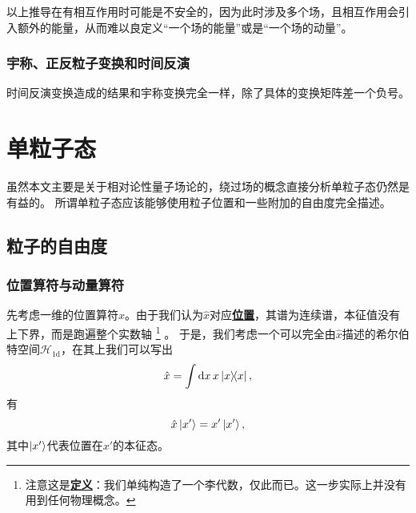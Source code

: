 \documentclass[hyperref, UTF8, a4paper]{ctexart}
\newcommand{\concept}[1]{\underline{\textbf{#1}}}
\begin{document}
以上推导在有相互作用时可能是不安全的，因为此时涉及多个场，且相互作用会引入额外的能量，从而难以良定义“一个场的能量”或是“一个场的动量”。

\subsubsection{宇称、正反粒子变换和时间反演}

时间反演变换造成的结果和宇称变换完全一样，除了具体的变换矩阵差一个负号。


\section{单粒子态}\label{sec:single-particle}


虽然本文主要是关于相对论性量子场论的，绕过场的概念直接分析单粒子态仍然是有益的。
所谓单粒子态应该能够使用粒子位置和一些附加的自由度完全描述。

\subsection{粒子的自由度}\label{sec:single-particle-quantity}

\subsubsection{位置算符与动量算符}\label{sec:position-and-momentum}

先考虑一维的位置算符$\hat{x}$。由于我们认为$\hat{x}$对应\concept{位置}，其谱为连续谱，本征值没有上下界，而是跑遍整个实数轴%
\footnote{注意这是\concept{定义}：我们单纯构造了一个李代数，仅此而已。这一步实际上并没有用到任何物理概念。}%
。
于是，我们考虑一个可以完全由$\hat{x}$描述的希尔伯特空间$\mathcal{H}_{1\text{d}}$，在其上我们可以写出
\begin{equation}
    \hat{x} = \int \dd{x} x \dyad{x},
\end{equation}
有
\begin{equation}
    \hat{x} \ket{x'} = x' \ket{x'},
\end{equation}
其中$\ket{x'}$代表位置在$x'$的本征态。
\end{document}
